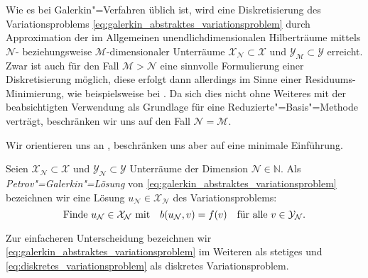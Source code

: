 \documentclass[../main.tex]{subfiles}
\begin{document}
Wie es bei Galerkin"=Verfahren üblich ist, wird eine Diskretisierung des Variationsproblems \cref{eq:galerkin_abstraktes_variationsproblem} durch Approximation der im Allgemeinen unendlichdimensionalen Hilberträume mittels $\mathcal N$- beziehungsweise $\mathcal M$-dimensionaler Unterräume $\mathcal X_{\mathcal N} \subset \mathcal X$ und $\mathcal Y_{\mathcal M} \subset \mathcal Y$ erreicht.
Zwar ist auch für den Fall $\mathcal M > \mathcal N$ eine sinnvolle Formulierung einer Diskretisierung möglich, diese erfolgt dann allerdings im Sinne einer Residuums-Minimierung, wie beispielsweise bei \cite{Andreev:2012ep}.
Da sich dies nicht ohne Weiteres mit der beabsichtigten Verwendung als Grundlage für eine Reduzierte"=Basis"=Methode verträgt, beschränken wir uns auf den Fall $\mathcal N = \mathcal M$.

Wir orientieren uns an \cite[Section 3.1]{Nochetto:2009il}, beschränken uns aber auf eine minimale Einführung.

\begin{Definition}\label{definition:disrekte_loesung}
    Seien $\mathcal X_{\mathcal N} \subset \mathcal X$ und $\mathcal Y_{\mathcal N} \subset \mathcal Y$ Unterräume der Dimension $\mathcal N \in \mathbb{N}$.
    Als \emph{Petrov"=Galerkin"=Lösung} von \cref{eq:galerkin_abstraktes_variationsproblem} bezeichnen wir eine Lösung $u_{\mathcal N} \in \mathcal X_{\mathcal N}$ des Variationsproblems:
    \begin{equation}\label{eq:diskretes_variationsproblem}
        \text{Finde}~u_{\mathcal N} \in \mathcal X_{\mathcal N} \text{ mit} \quad  b(u_{\mathcal N}, v) = f(v) \quad \fa v \in \mathcal Y_{\mathcal N}.
    \end{equation}
\end{Definition}

Zur einfacheren Unterscheidung bezeichnen wir \cref{eq:galerkin_abstraktes_variationsproblem} im Weiteren als stetiges und \cref{eq:diskretes_variationsproblem} als diskretes Variationsproblem.
\end{document}
